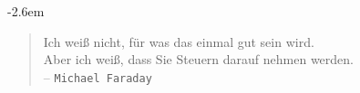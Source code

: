 \documentclass[14pt]{beamer}
\begin{document}
%
\begin{frame}
	
	\vspace{2em}
	\begingroup
	\advance\leftmargini -2.6em
	\begin{quote}
		Ich weiß nicht, für was das einmal gut sein wird.\\ Aber ich weiß, dass Sie Steuern darauf nehmen werden.\\ -- \texttt{Michael Faraday}
	\end{quote}
	\endgroup
\end{frame}
	
\end{document}
